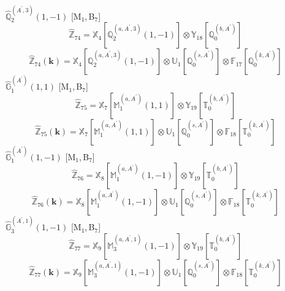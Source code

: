 \documentclass[fleqn,10pt,landscape]{article}
\begin{document}
\begin{itemize}
\begin{dmath*}
\end{dmath*}
\vspace{4mm}
\noindent {} $\,\,\,\hat{\mathbb{Q}}_{2}^{(A^{\prime},3)}(1,-1)$ [M$_{1}$,\,B$_{7}$]
\begin{dmath*}
\hat{\mathbb{Z}}_{74}=\mathbb{X}_{4}[\mathbb{Q}_{2}^{(a,A^{\prime},3)}(1,-1)] \otimes\mathbb{Y}_{18}[\mathbb{Q}_{0}^{(b,A^{\prime})}]
\end{dmath*}
\begin{dmath*}
\hat{\mathbb{Z}}_{74}(\bm{k})=\mathbb{X}_{4}[\mathbb{Q}_{2}^{(a,A^{\prime},3)}(1,-1)] \otimes\mathbb{U}_{1}[\mathbb{Q}_{0}^{(s,A^{\prime})}] \otimes\mathbb{F}_{17}[\mathbb{Q}_{0}^{(k,A^{\prime})}]
\end{dmath*}
\vspace{4mm}
\noindent {} $\,\,\,\hat{\mathbb{G}}_{1}^{(A^{\prime})}(1,1)$ [M$_{1}$,\,B$_{7}$]
\begin{dmath*}
\hat{\mathbb{Z}}_{75}=\mathbb{X}_{7}[\mathbb{M}_{1}^{(a,A^{\prime})}(1,1)] \otimes\mathbb{Y}_{19}[\mathbb{T}_{0}^{(b,A^{\prime})}]
\end{dmath*}
\begin{dmath*}
\hat{\mathbb{Z}}_{75}(\bm{k})=\mathbb{X}_{7}[\mathbb{M}_{1}^{(a,A^{\prime})}(1,1)] \otimes\mathbb{U}_{1}[\mathbb{Q}_{0}^{(s,A^{\prime})}] \otimes\mathbb{F}_{18}[\mathbb{T}_{0}^{(k,A^{\prime})}]
\end{dmath*}
\vspace{4mm}
\noindent {} $\,\,\,\hat{\mathbb{G}}_{1}^{(A^{\prime})}(1,-1)$ [M$_{1}$,\,B$_{7}$]
\begin{dmath*}
\hat{\mathbb{Z}}_{76}=\mathbb{X}_{8}[\mathbb{M}_{1}^{(a,A^{\prime})}(1,-1)] \otimes\mathbb{Y}_{19}[\mathbb{T}_{0}^{(b,A^{\prime})}]
\end{dmath*}
\begin{dmath*}
\hat{\mathbb{Z}}_{76}(\bm{k})=\mathbb{X}_{8}[\mathbb{M}_{1}^{(a,A^{\prime})}(1,-1)] \otimes\mathbb{U}_{1}[\mathbb{Q}_{0}^{(s,A^{\prime})}] \otimes\mathbb{F}_{18}[\mathbb{T}_{0}^{(k,A^{\prime})}]
\end{dmath*}
\vspace{4mm}
\noindent {} $\,\,\,\hat{\mathbb{G}}_{3}^{(A^{\prime},1)}(1,-1)$ [M$_{1}$,\,B$_{7}$]
\begin{dmath*}
\hat{\mathbb{Z}}_{77}=\mathbb{X}_{9}[\mathbb{M}_{3}^{(a,A^{\prime},1)}(1,-1)] \otimes\mathbb{Y}_{19}[\mathbb{T}_{0}^{(b,A^{\prime})}]
\end{dmath*}
\begin{dmath*}
\hat{\mathbb{Z}}_{77}(\bm{k})=\mathbb{X}_{9}[\mathbb{M}_{3}^{(a,A^{\prime},1)}(1,-1)] \otimes\mathbb{U}_{1}[\mathbb{Q}_{0}^{(s,A^{\prime})}] \otimes\mathbb{F}_{18}[\mathbb{T}_{0}^{(k,A^{\prime})}]

\end{dmath*}
\end{itemize}
\end{document}
